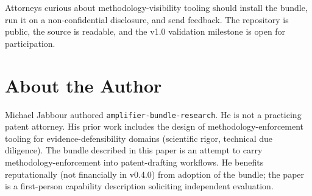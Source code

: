 \documentclass[11pt,letterpaper]{article}
\begin{document}
Attorneys curious about methodology-visibility tooling should install
the bundle, run it on a non-confidential disclosure, and send
feedback. The repository is public, the source is readable, and the
v1.0 validation milestone is open for participation.

\section*{About the Author}

Michael Jabbour authored \texttt{amplifier-bundle-research}. He is
not a practicing patent attorney. His prior work includes the design
of methodology-enforcement tooling for evidence-defensibility
domains (scientific rigor, technical due diligence). The bundle
described in this paper is an attempt to carry methodology-enforcement
into patent-drafting workflows. He benefits reputationally (not
financially in v0.4.0) from adoption of the bundle; the paper is a
first-person capability description soliciting independent
evaluation.
\end{document}
